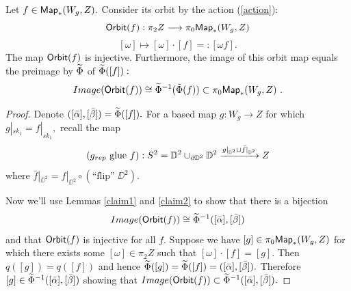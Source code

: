 \begin{prop} \label{p1uni}
Let $f \in {\sf Map}_{\ast}(W_{g}, Z).$ Consider its orbit by the action (\ref{action}):
\[
{\sf Orbit}(f): \pi_{2}Z \longrightarrow \pi_{0}{\sf Map}_{\ast}(W_{g}, Z)
\] 
\[
[\omega] \mapsto [\omega] \cdot [f] =: [\omega f].
\] 
The map ${\sf Orbit}(f)$ is injective. Furthermore, the image of this orbit map equals the preimage by $\widetilde{\Phi}$ of $\widetilde{\Phi}([f]):$
\[
Image({\sf Orbit}(f)) \cong  \widetilde{\Phi}^{-1}(\tilde{\Phi}(f)) \subset \pi_{0}{\sf Map}_{\ast}(W_{g}, Z)~.
\]
\end{prop}
\begin{proof}
Denote $([\bar{\alpha}] ,[\bar{\beta}]) = \widetilde{\Phi}([f]).$ For a based map $g \colon W_{g} \longrightarrow Z$ for which $g|_{sk_{1}} = f|_{sk_{1}},$ recall the map
\[
(g_{rep} \text{ glue } f): S^{2} = \mathbb D^{2} \cup_{\partial \mathbb D^{2}} \mathbb D^{2} \xrightarrow{g|_{\mathbb D^{2}} \cup \bar{f}|_{\mathbb D^{2}}} Z
\]
where $\bar{f}|_{\DD^{2}} = f|_{\DD^{2}} \circ (\text{``flip'' }\DD^{2}).$ \newline




Now we'll use Lemmas \ref{claim1} and \ref{claim2} to show that there is a bijection \[Image({\sf Orbit}(f)) \cong \widetilde{\Phi}^{-1}([\bar{\alpha}] ,[\bar{\beta}])\] and that ${\sf Orbit}(f)$ is injective for all $f$. \newline  \newline 
Suppose we have $[g] \in \pi_{0}{\sf Map}_{\ast}(W_{g}, Z)$ for which there exists some $[\omega] \in \pi_{2}Z$ such that $[\omega] \cdot [f] = [g].$ Then $q([g]) = q([f])$ and hence $\widetilde{\Phi}([g]) = \widetilde{\Phi}([f]) = ([\bar{\alpha}] ,[\bar{\beta}]).$ Therefore $[g] \in \widetilde{\Phi}^{-1}([\bar{\alpha}] ,[\bar{\beta}])$ showing that $Image({\sf Orbit}(f)) \subset \widetilde{\Phi}^{-1}([\bar{\alpha}] ,[\bar{\beta}]).$ \newline



\end{proof}
